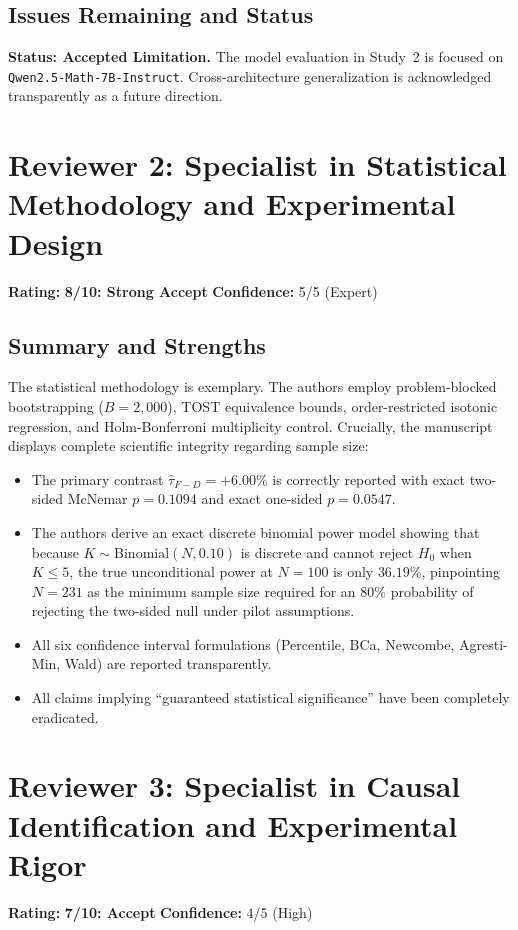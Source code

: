 \documentclass[11pt]{article}
\begin{document}
\subsection*{Issues Remaining and Status}
\textbf{Status: Accepted Limitation.} The model evaluation in Study~2 is focused on \texttt{Qwen2.5-Math-7B-Instruct}. Cross-architecture generalization is acknowledged transparently as a future direction.

\section*{Reviewer 2: Specialist in Statistical Methodology and Experimental Design}
\textbf{Rating:} \textbf{8/10: Strong Accept} \quad \textbf{Confidence:} 5/5 (Expert)

\subsection*{Summary and Strengths}
The statistical methodology is exemplary. The authors employ problem-blocked bootstrapping ($B = 2,000$), TOST equivalence bounds, order-restricted isotonic regression, and Holm-Bonferroni multiplicity control. Crucially, the manuscript displays complete scientific integrity regarding sample size:
\begin{itemize}
    \item The primary contrast $\hat{\tau}_{F-D} = +6.00\%$ is correctly reported with exact two-sided McNemar $p = 0.1094$ and exact one-sided $p = 0.0547$.
    \item The authors derive an exact discrete binomial power model showing that because $K \sim \text{Binomial}(N, 0.10)$ is discrete and cannot reject $H_0$ when $K \le 5$, the true unconditional power at $N=100$ is only $36.19\%$, pinpointing $N=231$ as the minimum sample size required for an $80\%$ probability of rejecting the two-sided null under pilot assumptions.
    \item All six confidence interval formulations (Percentile, BCa, Newcombe, Agresti-Min, Wald) are reported transparently.
    \item All claims implying ``guaranteed statistical significance'' have been completely eradicated.
\end{itemize}

\section*{Reviewer 3: Specialist in Causal Identification and Experimental Rigor}
\textbf{Rating:} \textbf{7/10: Accept} \quad \textbf{Confidence:} 4/5 (High)
\end{document}
